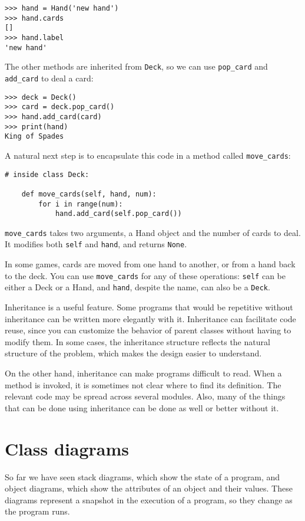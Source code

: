 \documentclass[10pt]{book}
\begin{document}
\begin{verbatim}
>>> hand = Hand('new hand')
>>> hand.cards
[]
>>> hand.label
'new hand'
\end{verbatim}
%
The other methods are inherited from {\tt Deck}, so we can use
\verb"pop_card" and \verb"add_card" to deal a card:

\begin{verbatim}
>>> deck = Deck()
>>> card = deck.pop_card()
>>> hand.add_card(card)
>>> print(hand)
King of Spades
\end{verbatim}
%
A natural next step is to encapsulate this code in a method
called \verb"move_cards":

\begin{verbatim}
# inside class Deck:

    def move_cards(self, hand, num):
        for i in range(num):
            hand.add_card(self.pop_card())
\end{verbatim}
%
\verb"move_cards" takes two arguments, a Hand object and the number of
cards to deal.  It modifies both {\tt self} and {\tt hand}, and
returns {\tt None}.

In some games, cards are moved from one hand to another,
or from a hand back to the deck.  You can use \verb"move_cards"
for any of these operations: {\tt self} can be either a Deck
or a Hand, and {\tt hand}, despite the name, can also be a {\tt Deck}.

Inheritance is a useful feature.  Some programs that would be
repetitive without inheritance can be written more elegantly
with it.  Inheritance can facilitate code reuse, since you can
customize the behavior of parent classes without having to modify
them.  In some cases, the inheritance structure reflects the natural
structure of the problem, which makes the design easier to
understand.

On the other hand, inheritance can make programs difficult to read.
When a method is invoked, it is sometimes not clear where to find its
definition.  The relevant code may be spread across several modules.
Also, many of the things that can be done using inheritance can be
done as well or better without it.


\section{Class diagrams}
\label{class.diagram}

So far we have seen stack diagrams, which show the state of
a program, and object diagrams, which show the attributes
of an object and their values.  These diagrams represent a snapshot
in the execution of a program, so they change as the program
runs.
\end{document}
